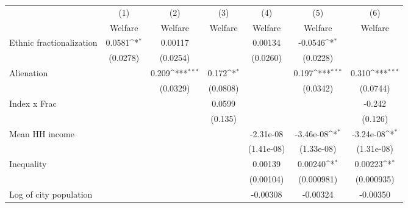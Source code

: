 {
\def\sym#1{\ifmmode^{#1}\else\(^{#1}\)\fi}
\begin{tabular}{l*{6}{c}}
\hline\hline
                    &\multicolumn{1}{c}{(1)}&\multicolumn{1}{c}{(2)}&\multicolumn{1}{c}{(3)}&\multicolumn{1}{c}{(4)}&\multicolumn{1}{c}{(5)}&\multicolumn{1}{c}{(6)}\\
                    &\multicolumn{1}{c}{Welfare}&\multicolumn{1}{c}{Welfare}&\multicolumn{1}{c}{Welfare}&\multicolumn{1}{c}{Welfare}&\multicolumn{1}{c}{Welfare}&\multicolumn{1}{c}{Welfare}\\
\hline
Ethnic fractionalization&      0.0581\sym{*}  &     0.00117         &                     &     0.00134         &     -0.0546\sym{*}  &                     \\
                    &    (0.0278)         &    (0.0254)         &                     &    (0.0260)         &    (0.0228)         &                     \\
[1em]
Alienation          &                     &       0.209\sym{***}&       0.172\sym{*}  &                     &       0.197\sym{***}&       0.310\sym{***}\\
                    &                     &    (0.0329)         &    (0.0808)         &                     &    (0.0342)         &    (0.0744)         \\
[1em]
Index x Frac        &                     &                     &      0.0599         &                     &                     &      -0.242         \\
                    &                     &                     &     (0.135)         &                     &                     &     (0.126)         \\
[1em]
Mean HH income      &                     &                     &                     &   -2.31e-08         &   -3.46e-08\sym{*}  &   -3.24e-08\sym{*}  \\
                    &                     &                     &                     &  (1.41e-08)         &  (1.33e-08)         &  (1.31e-08)         \\
[1em]
Inequality          &                     &                     &                     &     0.00139         &     0.00240\sym{*}  &     0.00223\sym{*}  \\
                    &                     &                     &                     &   (0.00104)         &  (0.000981)         &  (0.000935)         \\
[1em]
Log of city population&                     &                     &                     &    -0.00308         &    -0.00324         &    -0.00350         \\

\end{tabular}}
